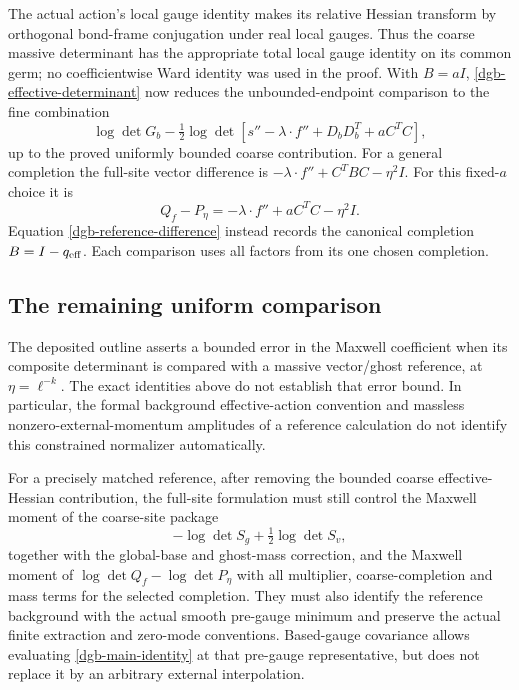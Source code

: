\documentclass[11pt]{article}
\theoremstyle{remark}
\begin{document}
The actual action's local gauge identity makes its
relative Hessian transform by orthogonal bond-frame
conjugation under real local gauges. Thus the coarse
massive determinant has the appropriate total local
gauge identity on its common germ; no coefficientwise
Ward identity was used in the proof.
With $B=aI$, \eqref{dgb-effective-determinant} now reduces
the unbounded-endpoint comparison to the fine combination
\[
 \log\det G_b-\tfrac12\log\det\!
       \left[s''-\lambda\cdot f''
                     +D_bD_b^T+aC^TC\right],
\]
up to the proved uniformly bounded coarse contribution.
For a general completion the full-site vector difference
is $-\lambda\cdot f''+C^TBC-\eta^2I$. For this fixed-$a$
choice it is
\begin{equation}
              Q_f-P_\eta
                    =-\lambda\cdot f''+aC^TC-\eta^2I.
 \label{dgb-fixed-a-difference}
\end{equation}
Equation \eqref{dgb-reference-difference} instead records
the canonical completion $B=I-q_{\rm eff}$.
Each comparison uses all factors from its one chosen
completion.

\subsection{The remaining uniform comparison}
\label{dgb-scope-section}

The deposited outline asserts a bounded error in the
Maxwell coefficient when its composite determinant is
compared with a massive vector/ghost reference, at
$\eta=\ell^{-k}$. The exact identities above do not
establish that error bound. In particular, the formal
background effective-action convention and massless
nonzero-external-momentum amplitudes of a reference
calculation do not identify this constrained normalizer
automatically.

For a precisely matched reference, after removing the
bounded coarse effective-Hessian contribution, the
full-site formulation must still control the Maxwell
moment of the coarse-site package
\[
                         -\log\det S_g+\tfrac12\log\det S_v,
\]
together with the global-base and ghost-mass correction,
and the Maxwell moment of
$\log\det Q_f-\log\det P_\eta$ with all multiplier,
coarse-completion and mass terms for the selected
completion. They must also identify
the reference background with the actual smooth pre-gauge
minimum and preserve the actual finite extraction and
zero-mode conventions. Based-gauge covariance allows
evaluating \eqref{dgb-main-identity} at that pre-gauge
representative, but does not replace it by an arbitrary
external interpolation.
\end{document}
